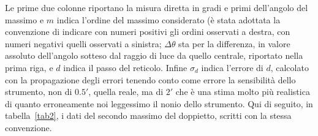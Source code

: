 \documentclass[a4paper,10pt]{article}
\begin{document}
	Le prime due colonne riportano la misura diretta in gradi e primi dell'angolo del massimo e $m$ indica l'ordine del massimo considerato (è stata adottata la convenzione di indicare con numeri positivi gli ordini osservati a destra, con numeri negativi quelli osservati a sinistra; $\Delta \theta$ sta per la differenza, in valore assoluto dell'angolo sotteso dal raggio di luce da quello centrale, riportato nella prima riga, e $d$ indica il passo del reticolo. Infine $\sigma _d$ indica l'errore di $d$, calcolato con la propagazione degli errori tenendo conto come errore la sensibilità dello strumento, non di $0.5'$, quella reale, ma di $2'$ che è una stima molto più realistica di quanto erroneamente noi leggessimo il nonio dello strumento. Qui di seguito, in tabella~\ref{tab2}, i dati del secondo massimo del doppietto, scritti con la stessa convenzione.
	
	\clearpage
	
\end{document}

